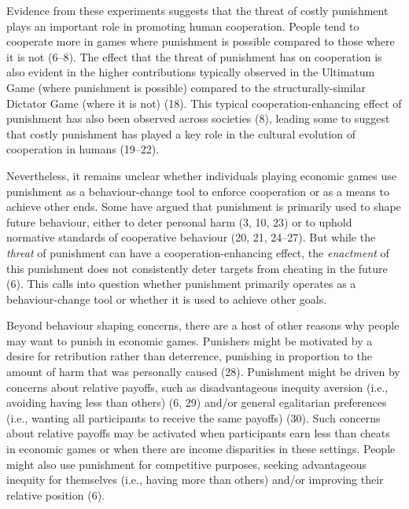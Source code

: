 \documentclass[
  man, donotrepeattitle,floatsintext]{apa6}
\begin{document}
Evidence from these experiments suggests that the threat of costly punishment
plays an important role in promoting human cooperation. People tend to cooperate
more in games where punishment is possible compared to those where it is not
(6--8). The effect that the threat of
punishment has on cooperation is also evident in the higher contributions
typically observed in the Ultimatum Game (where punishment is possible) compared
to the structurally-similar Dictator Game (where it is not) (18). This
typical cooperation-enhancing effect of punishment has also been observed across
societies (8), leading some to suggest that costly punishment has
played a key role in the cultural evolution of cooperation in humans
(19--22).

Nevertheless, it remains unclear whether individuals playing economic games use
punishment as a behaviour-change tool to enforce cooperation or as a means to
achieve other ends. Some have argued that punishment is primarily used to shape
future behaviour, either to deter personal harm (3, 10, 23) or to uphold normative standards of cooperative behaviour
(20, 21, 24--27).
But while the \emph{threat} of punishment can have a cooperation-enhancing effect,
the \emph{enactment} of this punishment does not consistently deter targets from
cheating in the future (6). This calls into question whether
punishment primarily operates as a behaviour-change tool or whether it is used
to achieve other goals.

Beyond behaviour shaping concerns, there are a host of other reasons why people
may want to punish in economic games. Punishers might be motivated by a desire
for retribution rather than deterrence, punishing in proportion to the amount
of harm that was personally caused (28). Punishment might be driven
by concerns about relative payoffs, such as disadvantageous inequity aversion
(i.e., avoiding having less than others) (6, 29) and/or
general egalitarian preferences (i.e., wanting all participants to receive the
same payoffs) (30). Such concerns about relative payoffs may be activated
when participants earn less than cheats in economic games or when there are
income disparities in these settings. People might also use punishment for
competitive purposes, seeking advantageous inequity for themselves (i.e., having
more than others) and/or improving their relative position (6).
\end{document}
